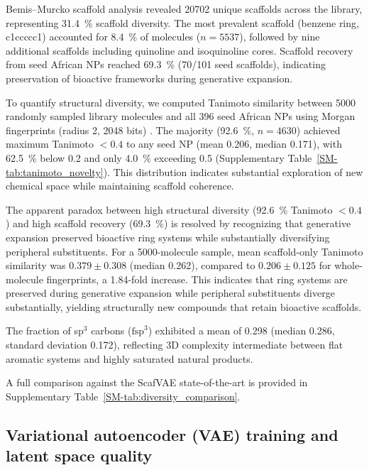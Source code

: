 \documentclass[journal=jcisd8,manuscript=article]{achemso}
\begin{document}
Bemis--Murcko scaffold analysis revealed \num{20702} unique scaffolds across the library, representing \qty{31.4}{\percent} scaffold diversity. The most prevalent scaffold (benzene ring, c1ccccc1) accounted for \qty{8.4}{\percent} of molecules ($n = \num{5537}$), followed by nine additional scaffolds including quinoline and isoquinoline cores. Scaffold recovery from seed African NPs reached \qty{69.3}{\percent} (\num{70}/\num{101} seed scaffolds), indicating preservation of bioactive frameworks during generative expansion.

To quantify structural diversity, we computed Tanimoto similarity between \num{5000} randomly sampled library molecules and all \num{396} seed African NPs using Morgan fingerprints (radius \num{2}, \num{2048} bits) \cite{Rogers2010, Morgan1965}. The majority (\qty{92.6}{\percent}, $n = \num{4630}$) achieved maximum Tanimoto $< \num{0.4}$ to any seed NP (mean \num{0.206}, median \num{0.171}), with \qty{62.5}{\percent} below \num{0.2} and only \qty{4.0}{\percent} exceeding \num{0.5} (Supplementary Table~\ref{SM-tab:tanimoto_novelty}). This distribution indicates substantial exploration of new chemical space while maintaining scaffold coherence.

The apparent paradox between high structural diversity (\qty{92.6}{\percent} Tanimoto $< \num{0.4}$) and high scaffold recovery (\qty{69.3}{\percent}) is resolved by recognizing that generative expansion preserved bioactive ring systems while substantially diversifying peripheral substituents. For a \num{5000}-molecule sample, mean scaffold-only Tanimoto similarity was $\num{0.379} \pm \num{0.308}$ (median \num{0.262}), compared to $\num{0.206} \pm \num{0.125}$ for whole-molecule fingerprints, a \num{1.84}-fold increase. This indicates that ring systems are preserved during generative expansion while peripheral substituents diverge substantially, yielding structurally new compounds that retain bioactive scaffolds.

The fraction of sp$^3$ carbons ($\text{fsp}^3$) exhibited a mean of \num{0.298} (median \num{0.286}, standard deviation \num{0.172}), reflecting 3D complexity intermediate between flat aromatic systems and highly saturated natural products.

A full comparison against the ScafVAE state-of-the-art is provided in Supplementary Table~\ref{SM-tab:diversity_comparison}.

\subsection{Variational autoencoder (VAE) training and latent space quality}
\label{sec:vae_training}
\end{document}

